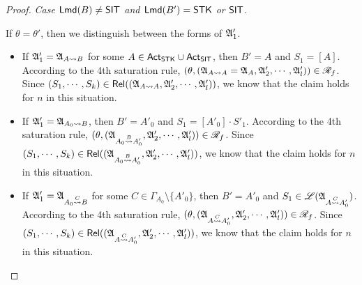 \begin{proof}
\noindent \emph{Case ${\sf Lmd}(B) \neq {\sf SIT}$ and ${\sf Lmd}(B') = {\sf STK}$ or ${\sf SIT}$}. 

If $\theta = \theta'$, then we distinguish between the forms of ${\mathfrak{A} }'_1$. 
\begin{itemize}
\item If ${\mathfrak{A} }'_1 = {\mathfrak{A} }_{A \rightsquigarrow B}$ for some $A \in {\sf Act}_{\sf STK} \cup {\sf Act}_{\sf SIT}$, then $B' = A$ and $S_1 = [A]$. According to the 4th saturation rule, $(\theta, ({\mathfrak{A} }_{A \rightsquigarrow A} = {\mathfrak{A} }_A, {\mathfrak{A} }'_2, \cdots, {\mathfrak{A} }'_l)) \in \mathscr{R}_f$. Since $(S_1, \cdots, S_k) \in \mathsf{Rel}(({\mathfrak{A} }_{A \rightsquigarrow A}, {\mathfrak{A} }'_2, \cdots, {\mathfrak{A} }'_l))$, we know that the claim holds for $n$ in this situation.

%
\item If ${\mathfrak{A} }'_1 = {\mathfrak{A} }_{A_0 \rightsquigarrow B}$, then $B' = A'_0$ and $S_1 = [A'_0] \cdot S'_1$.  According to the 4th saturation rule, $(\theta, ({\mathfrak{A} }_{A_0 \stackrel{B}{\rightsquigarrow} A'_0}, {\mathfrak{A} }'_2, \cdots, {\mathfrak{A} }'_l)) \in \mathscr{R}_f$. Since $(S_1, \cdots, S_k) \in \mathsf{Rel}(({\mathfrak{A} }_{A_0 \stackrel{B}{\rightsquigarrow} A'_0}, {\mathfrak{A} }'_2, \cdots, {\mathfrak{A} }'_l))$, we know that the claim holds for $n$ in this situation.

%
\item If ${\mathfrak{A} }'_1 = {\mathfrak{A} }_{A_0 \stackrel{C}{\rightsquigarrow} B}$ for some $C \in \Gamma_{A_0} \setminus \{A'_0\}$, then $B' = A'_0$ and $S_1 \in  {\mathscr{L} }({\mathfrak{A} }_{A \stackrel{C}{\rightsquigarrow} A'_0})$.  According to the 4th saturation rule, $(\theta, ({\mathfrak{A} }_{A \stackrel{C}{\rightsquigarrow} A'_0}, {\mathfrak{A} }'_2, \cdots, {\mathfrak{A} }'_l)) \in \mathscr{R}_f$. Since $(S_1, \cdots, S_k) \in \mathsf{Rel}(({\mathfrak{A} }_{A \stackrel{C}{\rightsquigarrow} A'_0}, {\mathfrak{A} }'_2, \cdots, {\mathfrak{A} }'_l))$, we know that the claim holds for $n$ in this situation.
\end{itemize}


\end{proof}

